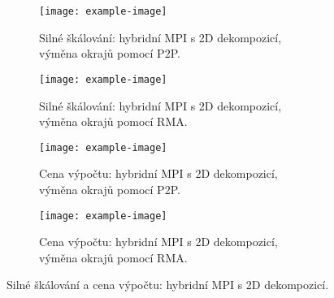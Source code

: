\documentclass{article}
\begin{document}
\begin{figure}[H]
    \centering
    \begin{subfigure}{0.45\textwidth}
        \centering
        \texttt{[image: example-image]}
        \caption{Silné škálování: hybridní MPI s 2D dekompozicí, výměna okrajů pomocí P2P.}
        \label{fig:2D_MPI_P2P_hybrid}
    \end{subfigure}
    \hfill
    \begin{subfigure}{0.45\textwidth}
        \centering
        \texttt{[image: example-image]}
        \caption{Silné škálování: hybridní MPI s 2D dekompozicí, výměna okrajů pomocí RMA.}
        \label{fig:2D_MPI_RMA_ hybrid}
    \end{subfigure}

     \begin{subfigure}{0.45\textwidth}
        \centering
        \texttt{[image: example-image]}
        \caption{Cena výpočtu: hybridní MPI s 2D dekompozicí, výměna okrajů pomocí P2P.}
        \label{fig:2D_MPI_P2P_hybrid}
    \end{subfigure}
    \hfill
    \begin{subfigure}{0.45\textwidth}
        \centering
        \texttt{[image: example-image]}
        \caption{Cena výpočtu: hybridní MPI s 2D dekompozicí, výměna okrajů pomocí RMA.}
        \label{fig:2D_MPI_RMA_ hybrid}
    \end{subfigure}
    \caption{Silné škálování a cena výpočtu: hybridní MPI s 2D dekompozicí.}
    \label{fig:2D_MPI_hybrid}
\end{figure}
\end{document}
